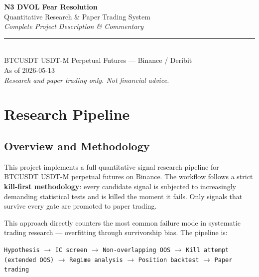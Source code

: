 \documentclass[11pt,a4paper]{article}
\begin{document}
\begin{titlepage}
  \centering
  \vspace*{3cm}
  {\huge\bfseries N3 DVOL Fear Resolution}\\[0.5em]
  {\large Quantitative Research \& Paper Trading System}\\[2em]
  {\large\itshape Complete Project Description \& Commentary}\\[3em]
  \rule{0.5\textwidth}{0.4pt}\\[2em]
  {\normalsize BTCUSDT USDT-M Perpetual Futures --- Binance / Deribit}\\[0.5em]
  {\normalsize As of 2026-05-13}\\[3em]
  \vfill
  {\small\textit{Research and paper trading only. Not financial advice.}}
\end{titlepage}

\tableofcontents
\newpage

\section{Research Pipeline}

\subsection{Overview and Methodology}

This project implements a full quantitative signal research pipeline for BTCUSDT USDT-M perpetual futures on Binance. The workflow follows a strict \textbf{kill-first methodology}: every candidate signal is subjected to increasingly demanding statistical tests and is killed the moment it fails. Only signals that survive every gate are promoted to paper trading.

This approach directly counters the most common failure mode in systematic trading research --- overfitting through survivorship bias. The pipeline is:

\begin{center}
\small
\texttt{Hypothesis} $\rightarrow$ \texttt{IC screen} $\rightarrow$ \texttt{Non-overlapping OOS} $\rightarrow$ \texttt{Kill attempt (extended OOS)}
$\rightarrow$ \texttt{Regime analysis} $\rightarrow$ \texttt{Position backtest} $\rightarrow$ \texttt{Paper trading}
\end{center}
\end{document}
